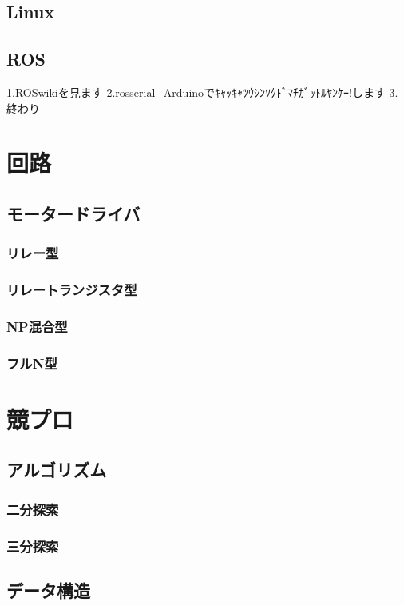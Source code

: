 \documentclass{jarticle}
\begin{document}
   \subsection{Linux}
   \subsection{ROS}
      1.ROSwikiを見ます
      2.rosserial_Arduinoでｷｬｯｷｬﾂｳｼﾝｿｸﾄﾞﾏﾁｶﾞｯﾄﾙﾔﾝｹｰ!します
      3.終わり
\clearpage

\section{回路}
   \subsection{モータードライバ}
      \subsubsection{リレー型}
      \subsubsection{リレートランジスタ型}
      \subsubsection{NP混合型}
      \subsubsection{フルN型}
\clearpage

\section{競プロ}
   \subsection{アルゴリズム}
      \subsubsection{二分探索}
      \subsubsection{三分探索}
   \subsection{データ構造}
\end{document}
